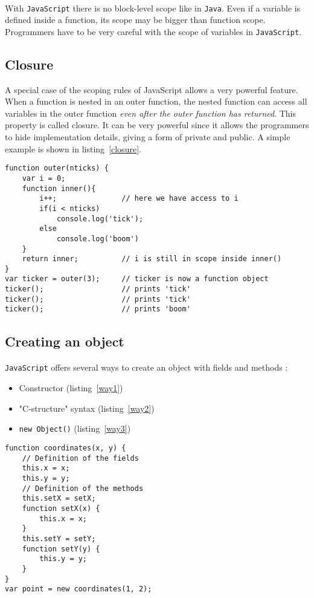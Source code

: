 \paragraph{}
With \texttt{JavaScript} there is no block-level scope like in \texttt{Java}. Even if a variable is defined inside a function, its scope may be bigger than function scope. Programmers have to be very careful with the scope of variables in \texttt{JavaScript}.
\subsection{Closure}
A special case of the scoping rules of JavaScript allows a very powerful feature. When a function is nested in an outer function, the nested function can access all variables in the outer function \emph{even after the outer function has returned}. This property is called closure. It can be very powerful since it allows the programmers to hide implementation details, giving a form of private and public. A simple example is shown in listing~\ref{closure}.
\begin{lstlisting}[caption={Example of closure}, label={closure}]
function outer(nticks) {
	var i = 0;
	function inner(){
		i++;               // here we have access to i
		if(i < nticks)
			console.log('tick');
		else
			console.log('boom')
	}
	return inner;          // i is still in scope inside inner()
}
var ticker = outer(3);     // ticker is now a function object
ticker();                  // prints 'tick'
ticker();                  // prints 'tick'
ticker();                  // prints 'boom'
\end{lstlisting}
\subsection{Creating an object}
\paragraph{}
\texttt{JavaScript} offers several ways to create an object with fields and methods :

\begin{itemize}
    \item Constructor (listing~\ref{way1})
    \item "C-structure" syntax (listing~\ref{way2})
    \item \texttt{new Object()} (listing~\ref{way3})
\end{itemize}
        
\begin{lstlisting}[caption={Creating an object with a constructor}, label={way1}]
function coordinates(x, y) {
    // Definition of the fields
    this.x = x;
    this.y = y;
    // Definition of the methods
    this.setX = setX;
    function setX(x) {
        this.x = x;
    }
    this.setY = setY;
    function setY(y) {
        this.y = y;
    }
}
var point = new coordinates(1, 2);
\end{lstlisting}
        
